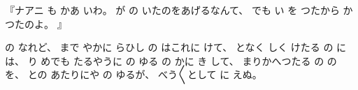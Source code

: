 『ナアニ
も
かあ
いわ。
%
が
の
いたのをあげるなんて、
%
でも
い
を
つたから
かつたのよ。
』

の
なれど、
%
まで
やかに
らひし
の
はこれに
けて、
%
となく
しく
けたる
の
には、
%
り
めでも
たるやうに
の
ゆる
の
かに
き
して、
%
まりかへつたる
の
の
を、
%
との
あたりにや
の
ゆるが、
%
べう〳〵として
に
えぬ。
